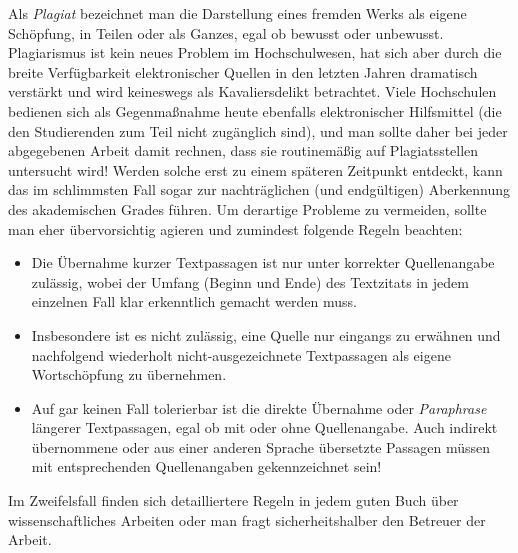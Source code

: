 Als \emph{Plagiat} bezeichnet man die Darstellung eines fremden Werks als eigene Schöpfung, 
in Teilen oder als Ganzes, egal ob bewusst oder unbewusst.
Plagiarismus ist kein neues Problem im Hochschulwesen, hat sich aber durch die 
breite Verfügbarkeit elektronischer Quellen in den letzten Jahren dramatisch 
verstärkt und wird keineswegs als Kavaliersdelikt betrachtet.
Viele Hochschulen bedienen sich als Gegenmaßnahme heute ebenfalls elektronischer Hilfsmittel 
(die den Studierenden zum Teil nicht zugänglich sind), und man sollte daher bei jeder 
abgegebenen Arbeit damit rechnen, dass sie routinemäßig auf Plagiatsstellen untersucht wird!
Werden solche erst zu einem späteren Zeitpunkt entdeckt, kann das im schlimmsten Fall sogar 
zur nachträglichen (und endgültigen) Aberkennung des akademischen Grades führen.
Um derartige Probleme zu vermeiden, sollte man eher übervorsichtig agieren und zumindest folgende Regeln beachten:
%
\begin{itemize}
\item
Die Übernahme kurzer Textpassagen ist nur unter korrekter Quellenangabe zulässig, wobei der Umfang (Beginn und Ende) des Textzitats in jedem einzelnen Fall klar erkenntlich gemacht werden muss. 
\item
Insbesondere ist es nicht zulässig, eine Quelle nur eingangs zu erwähnen und nachfolgend wiederholt nicht-ausgezeichnete Textpassagen als eigene Wortschöpfung zu übernehmen. 
\item
Auf gar keinen Fall tolerierbar ist die direkte Übernahme oder \emph{Paraphrase} längerer Textpassagen, egal ob mit oder ohne Quellenangabe. Auch indirekt übernommene oder aus einer anderen Sprache übersetzte Passagen müssen mit entsprechenden Quellenangaben gekennzeichnet sein! 
\end{itemize}
%
Im Zweifelsfall finden sich detailliertere Regeln in jedem guten Buch über wissenschaftliches Arbeiten oder man fragt sicherheitshalber den Betreuer der Arbeit.

